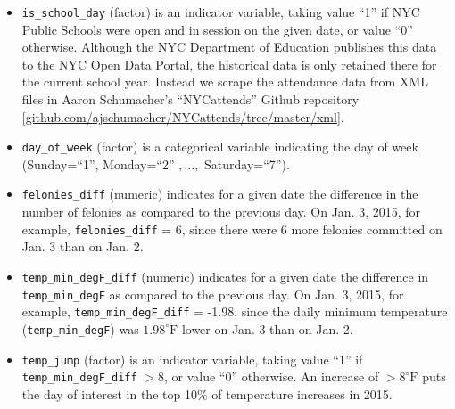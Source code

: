 \documentclass[11pt,notitlepage]{article}
\newcommand{\degf}{^\circ\text{F}}
\begin{document}
\begin{itemize}
\item \texttt{is_school_day} (factor) is an indicator variable, taking value ``1'' if NYC Public Schools were open and in session on the given date, or value ``0'' otherwise. Although the NYC Department of Education publishes this data to the NYC Open Data Portal, the historical data is only retained there for the current school year. Instead we scrape the attendance data from XML files in Aaron Schumacher's ``NYCattends'' Github repository [\href{https://github.com/ajschumacher/NYCattends/tree/master/xml}{github.com/ajschumacher/NYCattends/tree/master/xml}].


\item \texttt{day_of_week} (factor) is a categorical variable indicating the day of week (Sunday=``1'', Monday=``2'' $, \ldots, $ Saturday=``7''). 

\item \texttt{felonies_diff} (numeric) indicates for a given date the difference in the number of felonies as compared to the previous day. On Jan. 3, 2015, for example, \texttt{felonies_diff} = 6, since there were 6 more felonies committed on Jan. 3 than on Jan. 2.

\item \texttt{temp_min_degF_diff} (numeric) indicates for a given date the difference in \texttt{temp_min_degF} as compared to the previous day. On Jan. 3, 2015, for example, \texttt{temp_min_degF_diff} = -1.98, since the daily minimum temperature (\texttt{temp_min_degF}) was $1.98 \degf$ lower on Jan. 3 than on Jan. 2.

\item \texttt{temp_jump} (factor) is an indicator variable, taking value ``1'' if \texttt{temp_min_degF_diff} $> 8$, or value ``0'' otherwise. An increase of $> 8 \degf$ puts the day of interest in the top 10\% of temperature increases in 2015.

\end{itemize}

\end{document}
